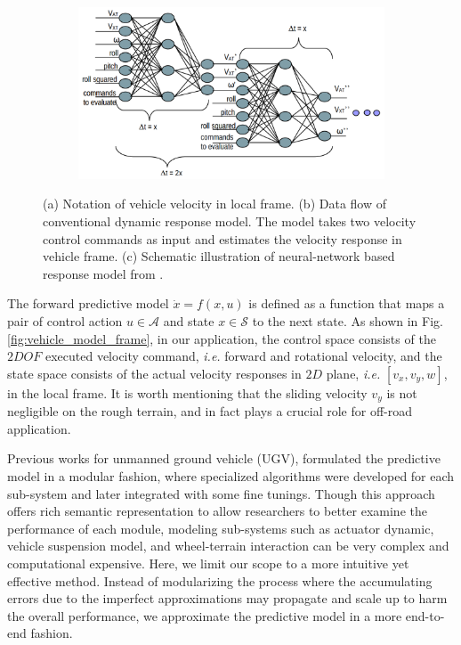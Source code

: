 \documentclass[../thesis.tex]{subfiles}
\begin{document}
\begin{figure}[t]
\begin{subfigure}[b]{0.8\linewidth}
    	 \includegraphics[width=\columnwidth]{./RRTPlanner/fig/neuralnet_model.png}
           	\subcaption{}
           	\label{fig:vehicle_model_net}
    	\end{subfigure}
    	\caption{(a) Notation of vehicle velocity in local frame. (b) Data flow of conventional dynamic response model. The model takes two velocity control commands as input and estimates the velocity response in vehicle frame. (c) Schematic illustration of neural-network based response model from \cite{bode2007learning}.}
	\label{fig:vehicle_model}
\end{figure}
 
 
The forward predictive model $\dot{x}=f(x,u)$ is defined as a function that maps a pair of control action $u \in \mathcal{A}$ and state $x \in \mathcal{S}$ to the next state. As shown in Fig. \ref{fig:vehicle_model_frame}, in our application, the control space consists of the $2DOF$ executed velocity command, \textit{i.e.} forward and rotational velocity, and the state space consists of the actual velocity responses in $2D$ plane, \textit{i.e.} $[v_x, v_y, w]$, in the local frame. It is worth mentioning that the sliding velocity $v_y$ is not negligible on the rough terrain, and in fact plays a crucial role for off-road application.
 
 
Previous works \cite{kelly2007terrain,howard2006trajectory,howard2005terrain} for unmanned ground vehicle (UGV), formulated the predictive model in a modular fashion, where specialized algorithms were developed for each sub-system and later integrated with some fine tunings. Though this approach offers rich semantic representation to allow researchers to better examine the performance of each module, modeling sub-systems such as actuator dynamic, vehicle suspension model, and wheel-terrain interaction can be very complex and computational expensive.
Here, we limit our scope to a more intuitive yet effective method. Instead of modularizing the process where the accumulating errors due to the imperfect approximations may propagate and scale up to harm the overall performance, we approximate the predictive model in a more end-to-end fashion.
 
\end{document}
